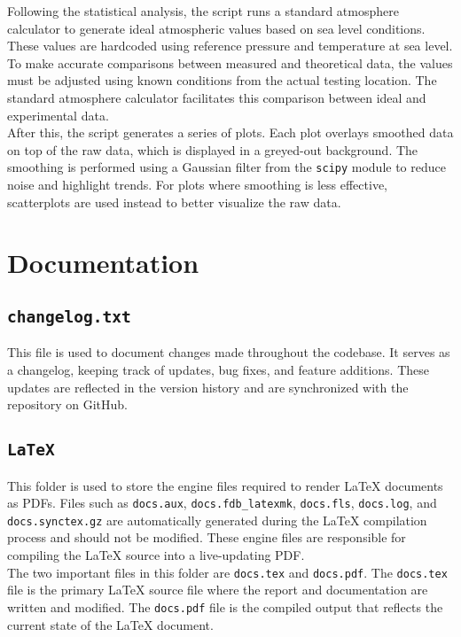 \documentclass[12pt]{report}
\begin{document}
Following the statistical analysis, the script runs a standard atmosphere calculator to generate ideal atmospheric values based on sea level conditions. These values are hardcoded using reference pressure and temperature at sea level. To make accurate comparisons between measured and theoretical data, the values must be adjusted using known conditions from the actual testing location. The standard atmosphere calculator facilitates this comparison between ideal and experimental data. \\

After this, the script generates a series of plots. Each plot overlays smoothed data on top of the raw data, which is displayed in a greyed-out background. The smoothing is performed using a Gaussian filter from the \texttt{scipy} module to reduce noise and highlight trends. For plots where smoothing is less effective, scatterplots are used instead to better visualize the raw data. \\


\section{Documentation}
\subsection{\texttt{changelog.txt}}
This file is used to document changes made throughout the codebase. It serves as a changelog, keeping track of updates, bug fixes, and feature additions. These updates are reflected in the version history and are synchronized with the repository on GitHub.

\subsection{\texttt{LaTeX}}
This folder is used to store the engine files required to render LaTeX documents as PDFs. Files such as \texttt{docs.aux}, \texttt{docs.fdb\_latexmk}, \texttt{docs.fls}, \texttt{docs.log}, and \texttt{docs.synctex.gz} are automatically generated during the LaTeX compilation process and should not be modified. These engine files are responsible for compiling the LaTeX source into a live-updating PDF. \\

The two important files in this folder are \texttt{docs.tex} and \texttt{docs.pdf}. The \texttt{docs.tex} file is the primary LaTeX source file where the report and documentation are written and modified. The \texttt{docs.pdf} file is the compiled output that reflects the current state of the LaTeX document.
\end{document}
